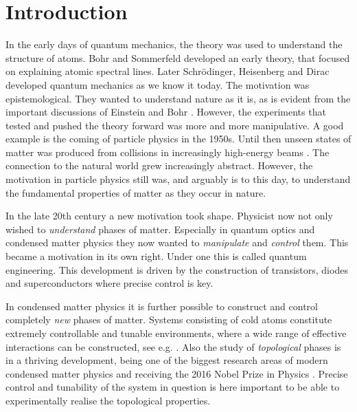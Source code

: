 
\chapter{Introduction} %

\label{Chapter1} %


In the early days of quantum mechanics, the theory was used to understand the structure of atoms. Bohr and Sommerfeld developed an early theory, that focused on explaining atomic spectral lines. Later Schr{\"o}dinger, Heisenberg and Dirac developed quantum mechanics as we know it today. The motivation was epistemological. They wanted to understand nature as it is, as is evident from the important discussions of Einstein and Bohr \cite{EinsteinEPRparadox, BohrEPRparadox}. However, the experiments that tested and pushed the theory forward was more and more manipulative. A good example is the coming of particle physics in the 1950s. Until then unseen states of matter was produced from collisions in increasingly high-energy beams \cite{Martin.NuclearAndParticlePhysics}. The connection to the natural world grew increasingly abstract. However, the motivation in particle physics still was, and arguably is to this day, to understand the fundamental properties of matter as they occur in nature. 

In the late 20th century a new motivation took shape. Physicist now not only wished to \textit{understand} phases of matter. Especially in quantum optics and condensed matter physics they now wanted to \textit{manipulate} and \textit{control} them. This became a motivation in its own right. Under one this is called quantum engineering. This development is driven by the construction of transistors, diodes and superconductors where precise control is key. 

In condensed matter physics it is further possible to construct and control completely \textit{new} phases of matter. Systems consisting of cold atoms constitute extremely controllable and tunable environments, where a wide range of effective interactions can be constructed, see e.g. \cite{Pohl.supersolidity, BruunZhigangTopSuperfluid}. Also the study of \textit{topological} phases is in a thriving development, being one of the biggest research areas of modern condensed matter physics and receiving the 2016 Nobel Prize in Physics \cite{NobelPrize2016}. Precise control and tunability of the system in question is here important to be able to experimentally realise the topological properties. 

